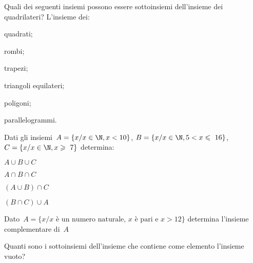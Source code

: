 \begin{esercizio}
\label{ese:7.84}
Quali dei seguenti insiemi possono essere sottoinsiemi dell'insieme dei 
quadrilateri?
L'insieme dei:
\vspace*{-12pt}
\begin{multicols}{3}
\begin{enumeratea}
 \item quadrati;
 \item rombi;
 \item trapezi;
 \item triangoli equilateri;
 \item poligoni;
 \item parallelogrammi.
\end{enumeratea}
\end{multicols}
\vspace{-12pt}
\end{esercizio}

\begin{esercizio}
\label{ese:7.85}
Dati gli insiemi~\(A=\{x/x\in\N,x<10\}\), \(B=\{x/x\in\N,5<x\leqslant~16\}\),
\(C=\{x/x\in \N,x\geqslant~7\}\) determina:
\begin{multicols}{4}
\begin{enumeratea}
\item \(A\cup B\cup C\)
\item \(A\cap B\cap C\)
\item \((A\cup B)\cap C\)
\item \((B\cap C)\cup A\)
\end{enumeratea}
\end{multicols}
\end{esercizio}


\begin{esercizio}
\label{ese:7.86}
Dato~\(A = \{x/x\text{ è un numero naturale, } x \text{ è pari e }x>12\}\) 
determina l'insieme complementare di~\(A\)
\end{esercizio}

\begin{esercizio}
\label{ese:7.87}
Quanti sono i sottoinsiemi dell'insieme che contiene come elemento
l'insieme vuoto?
\end{esercizio}


